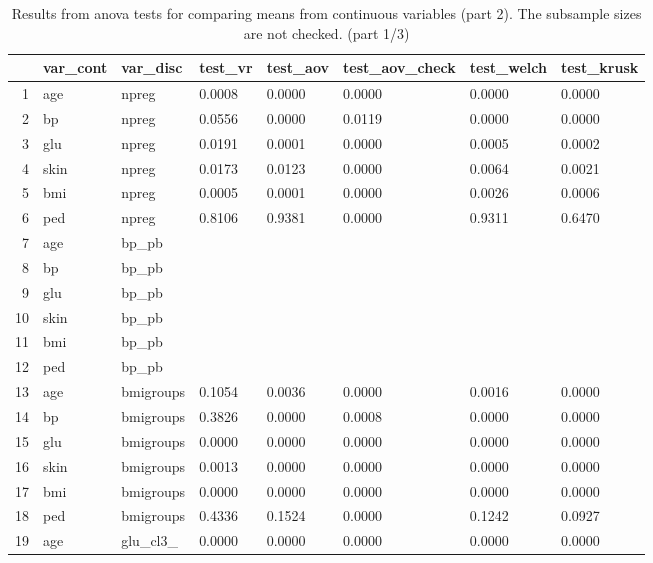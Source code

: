 \documentclass[12pt]{article}
\begin{document}
\begin{landscape}
\newpage
\begin{table}[ht]
\centering
\begin{tabular}{rlllllll}
  \hline
 & var\_cont & var\_disc & test\_vr & test\_aov & test\_aov\_check & test\_welch & test\_krusk \\ 
  \hline
1 & age & npreg & 0.0008 & 0.0000 & 0.0000 & 0.0000 & 0.0000 \\ 
  2 & bp & npreg & 0.0556 & 0.0000 & 0.0119 & 0.0000 & 0.0000 \\ 
  3 & glu & npreg & 0.0191 & 0.0001 & 0.0000 & 0.0005 & 0.0002 \\ 
  4 & skin & npreg & 0.0173 & 0.0123 & 0.0000 & 0.0064 & 0.0021 \\ 
  5 & bmi & npreg & 0.0005 & 0.0001 & 0.0000 & 0.0026 & 0.0006 \\ 
  6 & ped & npreg & 0.8106 & 0.9381 & 0.0000 & 0.9311 & 0.6470 \\ 
  7 & age & bp\_pb &   &   &   &   &   \\ 
  8 & bp & bp\_pb &   &   &   &   &   \\ 
  9 & glu & bp\_pb &   &   &   &   &   \\ 
  10 & skin & bp\_pb &   &   &   &   &   \\ 
  11 & bmi & bp\_pb &   &   &   &   &   \\ 
  12 & ped & bp\_pb &   &   &   &   &   \\ 
  13 & age & bmigroups & 0.1054 & 0.0036 & 0.0000 & 0.0016 & 0.0000 \\ 
  14 & bp & bmigroups & 0.3826 & 0.0000 & 0.0008 & 0.0000 & 0.0000 \\ 
  15 & glu & bmigroups & 0.0000 & 0.0000 & 0.0000 & 0.0000 & 0.0000 \\ 
  16 & skin & bmigroups & 0.0013 & 0.0000 & 0.0000 & 0.0000 & 0.0000 \\ 
  17 & bmi & bmigroups & 0.0000 & 0.0000 & 0.0000 & 0.0000 & 0.0000 \\ 
  18 & ped & bmigroups & 0.4336 & 0.1524 & 0.0000 & 0.1242 & 0.0927 \\ 
  19 & age & glu\_cl3\_ & 0.0000 & 0.0000 & 0.0000 & 0.0000 & 0.0000 \\ 
   \hline
\end{tabular}
\caption{Results from anova tests for comparing means from continuous variables (part 2). The subsample sizes are not checked. (part 1/3)} 
\label{tab:anova.test2.1}
\end{table}
 

\end{landscape}
\end{document}
